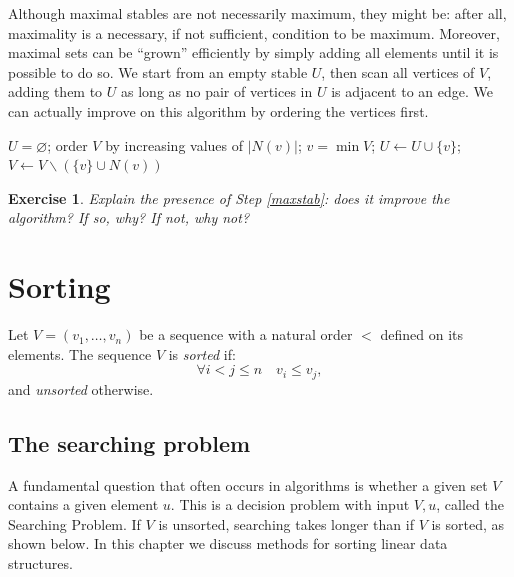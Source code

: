 \documentclass[a4paper]{book}
\theoremstyle{changebreak}                %
\newtheorem{ex}[result]{Exercise}
\begin{document}
Although maximal stables are not necessarily maximum, they might be:
after all, maximality is a necessary, if not sufficient, condition to
be maximum. Moreover, maximal sets can be ``grown'' efficiently by
simply adding all elements until it is possible to do so. We start
from an empty stable $U$, then scan all vertices of $V$, adding them
to $U$ as long as no pair of vertices in $U$ is adjacent to an
edge. We can actually improve on this algorithm by ordering the
vertices first.
\begin{algorithmic}[1]
\STATE $U=\varnothing$;
\STATE order $V$ by increasing values of $|N(v)|$;
   \STATE $v=\min V$;
   \STATE $U\leftarrow U\cup \{v\}$;
   \STATE $V\leftarrow V\smallsetminus (\{v\}\cup N(v))$ \label{maxstab}
\ENDWHILE
\end{algorithmic}

\begin{ex}
Explain the presence of Step \ref{maxstab}: does it improve the
algorithm? If so, why? If not, why not?
\end{ex}

\chapter{Sorting}
\label{c:sort}

\begin{center}
\end{center}


Let $V=(v_1,\ldots,v_n)$ be a sequence with a natural
order $<$ defined on its elements. The sequence
$V$ is {\it sorted} if:
\begin{equation}
  \forall i<j\le n\quad v_i\le v_j, 
  \label{eq:sort}
\end{equation}
and {\it unsorted} otherwise.

\section{The searching problem}
\label{s:sort:searching}
A fundamental question that often occurs in algorithms is whether a
given set $V$ contains a given element $u$. This is a decision
problem with input $V,u$, called
the {\sc Searching Problem}. If $V$ is unsorted,
searching takes longer than if $V$ is
sorted, as shown below. In this chapter we discuss
methods for sorting linear data
structures.
\end{document}
